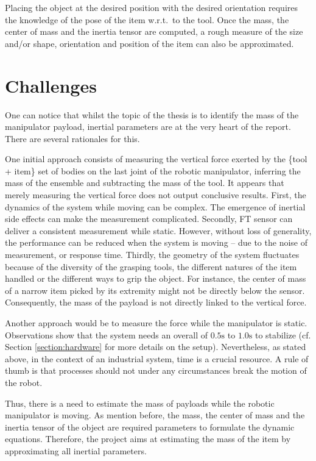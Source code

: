 \documentclass[/home/francois/latex/report/main.tex]{subfiles}
\begin{document}
Placing the object at the desired position with the desired orientation requires the knowledge of the pose of the item w.r.t.\ to the tool. Once the mass, the center of mass and the inertia tensor are computed, a rough measure of the size and/or shape, orientation and position of the item can also be approximated.

\section{Challenges}

One can notice that whilst the topic of the thesis is to identify the mass of the manipulator payload, inertial parameters are at the very heart of the report. There are several rationales for this.

One initial approach consists of measuring the vertical force exerted by the \{tool + item\} set of bodies on the last joint of the robotic manipulator, inferring the mass of the ensemble and subtracting the mass of the tool. It appears that merely measuring the vertical force does not output conclusive results. First, the dynamics of the system while moving can be complex. The emergence of inertial side effects can make the measurement complicated. Secondly, \ac{FT} sensor can deliver a consistent measurement while static. However, without loss of generality, the performance can be reduced when the system is moving – due to the noise of measurement, or response time. Thirdly, the geometry of the system fluctuates because of the diversity of the grasping tools, the different natures of the item handled or the different ways to grip the object. For instance, the center of mass of a narrow item picked by its extremity might not be directly below the sensor. Consequently, the mass of the payload is not directly linked to the vertical force.

Another approach would be to measure the force while the manipulator is static. Observations show that the system needs an overall of $0.5 \si{\second}$ to $1.0 \si{\second}$ to stabilize (cf. Section \ref{section:hardware} for more details on the setup). Nevertheless, as stated above, in the context of an industrial system, time is a crucial resource. A rule of thumb is that processes should not under any circumstances break the motion of the robot.

Thus, there is a need to estimate the mass of payloads while the robotic manipulator is moving. As mention before, the mass, the center of mass and the inertia tensor of the object are required parameters to formulate the dynamic equations. Therefore, the project aims at estimating the mass of the item by approximating all inertial parameters.
\end{document}
